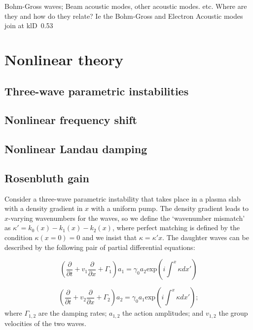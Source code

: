 Bohm-Gross waves; Beam acoustic modes, other acoustic modes.
etc. Where are they and how do they relate? Ie the Bohm-Gross and Electron
Acoustic modes join at klD~0.53

\section{Nonlinear theory}
\subsection{Three-wave parametric instabilities}
\subsection{Nonlinear frequency shift}
\subsection{Nonlinear Landau damping}

\subsection{Rosenbluth gain}

Consider a three-wave parametric instability that takes place in a plasma slab with a density gradient in $x$ with a uniform pump. The density gradient leads to $x$-varying wavenumbers for the waves, so we define the `wavenumber mismatch' as $\kappa' = k_0(x) - k_1(x) - k_2(x)$, where perfect matching is defined by the condition $\kappa(x=0) = 0$ and we insist that $\kappa = \kappa' x$. The daughter waves can be described by the following pair of partial differential equations:

\begin{equation}
 \left(\frac{\partial}{\partial t} + v_1\frac{\partial}{\partial x} + \Gamma_1 \right)a_1 = \gamma_0a_2\text{exp}\left(i\int^x \kappa dx'\right)
\end{equation}

\begin{equation}
 \left(\frac{\partial}{\partial t} + v_2\frac{\partial}{\partial x} + \Gamma_2 \right)a_2 = \gamma_0a_1\text{exp}\left(i\int^x \kappa dx'\right);
\end{equation} 
where $\Gamma_{1,2}$ are the damping rates; $a_{1,2}$ the action amplitudes; and $v_{1,2}$ the group velocities of the two waves. 

